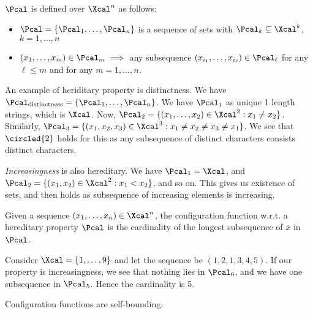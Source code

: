 \begin{definition}
$\Pcal$ is defined over $\Xcal^n$ as follows:
\begin{itemize}
    \item[\circled{1}] $\Pcal = \{\Pcal_1, \dots, \Pcal_n\}$ is a sequence of sets with $\Pcal_k \subseteq \Xcal^k$, $k = 1, \dots, n$
    \item[\circled{2}] $(x_1, \dots, x_m) \in \Pcal_m \implies$ any subsequence $(x_{i_1}, \dots, x_{i_\ell}) \in \Pcal_\ell$ for any $\ell \leq m$ and for any $m = 1, \dots, n$.
\end{itemize}
\end{definition}
\begin{eg}
An example of heriditary property is distinctness. We have $\Pcal_{\text{distinctness}} = \{\Pcal_1, \dots, \Pcal_n\}$. We have $\Pcal_1$ as unique 1 length strings, which is $\Xcal$. Now, $\Pcal_2 = \{(x_1, \dots, x_2) \in \Xcal^2: x_1\neq x_2\}$. Similarly, $\Pcal_3 = \{(x_1,x_2,x_3) \in \Xcal^3 : x_1\neq x_2\neq x_3\neq x_1\}$. We see that $\circled{2}$ holds for this as any subsequence of distinct characters consists distinct characters.
\end{eg}
\begin{eg}
\textit{Increasingness} is also hereditary. We have $\Pcal_1 = \Xcal$, and $\Pcal_2 = \{(x_1, x_2) \in \Xcal^2 : x_1 < x_2\}$, and so on. This gives us existence of sets, and then  holds as subsequence of increasing elements is increasing.
\end{eg}
\begin{definition}
Given a sequence $(x_1, \dots, x_n) \in \Xcal^n$, the configuration function w.r.t. a hereditary property $\Pcal$ is the cardinality of the longest subsequence of $\overline{x}$ in $\Pcal$.
\end{definition}
\begin{eg}
Consider $\Xcal = \{1,\dots,9\}$ and let the sequence be $(1, 2, 1, 3, 4, 5)$. If our property is increasingness, we see that nothing lies in $\Pcal_6$, and we have one subsequence in $\Pcal_5$. Hence the cardinality is 5.
\end{eg}
\begin{prop}
Configuration functions are self-bounding. 
\end{prop}
